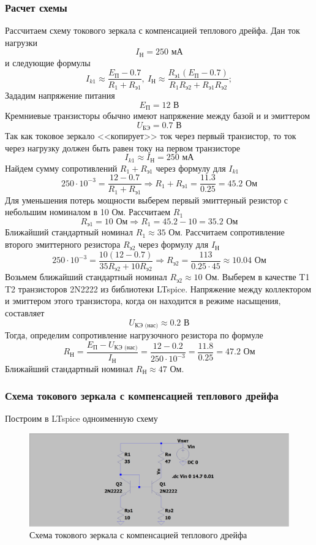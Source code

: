 \documentclass[a4paper, 12pt]{article}
\begin{document}
    \subsubsection{Расчет схемы}
    Рассчитаем схему токового зеркала с компенсацией теплового дрейфа.
    Дан ток нагрузки $$I_\text{Н}=250\text{ мА}$$
    и следующие формулы
    $$
    I_{k1}\approx\dfrac{E_\text{П}-0.7}{R_1+R_\text{э1}},\ I_\text{Н}\approx\dfrac{R_\text{э1}\left( E_\text{П}-0.7 \right)}{R_1R_\text{э2}+R_\text{э1}R_\text{э2}};
    $$
    Зададим напряжение питания $$E_\text{П}=12\text{ В}$$
    Кремниевые транзисторы обычно имеют напряжение между базой и и эмиттером
    $$
    U_\text{БЭ}=0.7\text{ В}
    $$
    Так как токовое зеркало <<копирует>> ток через первый транзистор, то ток через
    нагрузку должен быть равен току на первом транзисторе
    $$
    I_{k1}\approx I_\text{Н}=250\text{ мА}
    $$
    Найдем сумму сопротивлений $R_1+R_\text{э1}$ через формулу для $I_{k1}$
    $$
    250\cdot10^{-3}=\dfrac{12-0.7}{R_1+R_\text{э1}}\Rightarrow R_1+R_\text{э1}=\dfrac{11.3}{0.25}=45.2\text{ Ом}
    $$
    Для уменьшения потерь мощности выберем первый эмиттерный резистор с небольшим номиналом в 10 Ом. Рассчитаем $R_1$
    $$
    R_\text{э1}=10\text{ Ом}\Rightarrow R_1=45.2-10=35.2\text{ Ом}
    $$
    Ближайший стандартный номинал $R_1\approx35$ Ом. Рассчитаем сопротивление второго эмиттерного резистора $R_\text{э2}$ через формулу для $I_\text{Н}$
    $$
    250\cdot10^{-3}=\dfrac{10\left( 12-0.7 \right)}{35R_\text{э2}+10R_\text{э2}}\Rightarrow R_\text{э2}=\dfrac{113}{0.25\cdot45}\approx10.04\text{ Ом}
    $$
    Возьмем ближайший стандартный номинал $R_\text{э2}\approx10$ Ом. Выберем в качестве T1 T2 транзисторов 2N2222 из библиотеки LTspice.
    Напряжение между коллектором и эмиттером этого транзистора, когда он находится в режиме насыщения, составляет
    $$
    U_\text{КЭ (нас)}\approx0.2\text{ В}
    $$
    Тогда, определим сопротивление нагрузочного резистора по формуле
    $$
    R_\text{Н}=\dfrac{E_\text{П}-U_\text{КЭ (нас)}}{I_\text{Н}}=\dfrac{12-0.2}{250\cdot10^{-3}}=\dfrac{11.8}{0.25}=47.2\text{ Ом}
    $$
    Ближайший стандартный номинал $R_\text{Н}\approx47$ Ом.


    \subsubsection{Схема токового зеркала с компенсацией теплового дрейфа}
    Построим в LTspice одноименную схему
    \begin{figure}[H]
        \centering
        \includegraphics[scale=0.22]{scheme1.png}
        \captionsetup{skip=0pt}
        \caption{Схема токового зеркала с компенсацией теплового дрейфа}
        \label{fig:scheme1}
    \end{figure}
\end{document}
